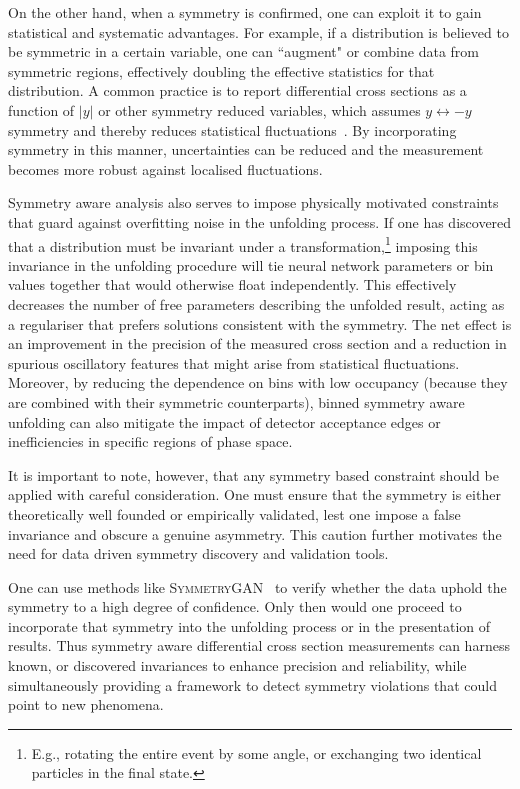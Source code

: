         On the other hand, when a symmetry is confirmed, one can exploit it to gain statistical and systematic advantages.
        For example, if a distribution is believed to be symmetric in a certain variable, one can ``augment" or combine data from symmetric regions, effectively doubling the effective statistics for that distribution.
        A common practice is to report differential cross sections as a function of $|y|$ or other symmetry reduced variables, which assumes $y \leftrightarrow -y$ symmetry and thereby reduces statistical fluctuations~\cite{CMS:2013zfg, ATLAS:2014rjv, ATLAS:2016vlf}.
        By incorporating symmetry in this manner, uncertainties can be reduced and the measurement becomes more robust against localised fluctuations.

        Symmetry aware analysis also serves to impose physically motivated constraints that guard against overfitting noise in the unfolding process.
        If one has discovered that a distribution must be invariant under a transformation,\footnote{E.g., rotating the entire event by some angle, or exchanging two identical particles in the final state.} imposing this invariance in the unfolding procedure will tie neural network parameters or bin values together that would otherwise float independently.
        This effectively decreases the number of free parameters describing the unfolded result, acting as a regulariser that prefers solutions consistent with the symmetry.
        The net effect is an improvement in the precision of the measured cross section and a reduction in spurious oscillatory features that might arise from statistical fluctuations.
        Moreover, by reducing the dependence on bins with low occupancy (because they are combined with their symmetric counterparts), binned symmetry aware unfolding can also mitigate the impact of detector acceptance edges or inefficiencies in specific regions of phase space.

        It is important to note, however, that any symmetry based constraint should be applied with careful consideration. One must ensure that the symmetry is either theoretically well founded or empirically validated, lest one impose a false invariance and obscure a genuine asymmetry.
        This caution further motivates the need for data driven symmetry discovery and validation tools.
        
        One can use methods like \textsc{SymmetryGAN}~\cite{PhysRevD.105.096031} to verify whether the data uphold the symmetry to a high degree of confidence.
        Only then would one proceed to incorporate that symmetry into the unfolding process or in the presentation of results.
        Thus symmetry aware differential cross section measurements can harness known, or discovered invariances to enhance precision and reliability, while simultaneously providing a framework to detect symmetry violations that could point to new phenomena.
    

